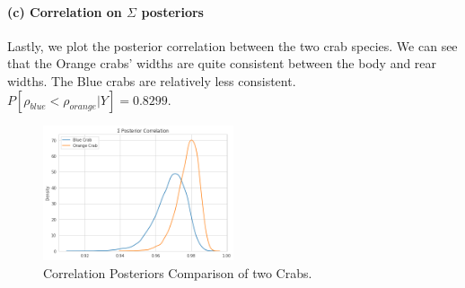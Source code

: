 \documentclass[11pt, letterpaper]{article}
\begin{document}
\paragraph{(c) Correlation on $\Sigma$ posteriors}
Lastly, we plot the posterior correlation between the two crab species. We can see that the Orange crabs' widths are quite consistent between the body and rear widths. The Blue crabs are relatively less consistent. $P[\rho_{blue} < \rho_{orange}|Y] = 0.8299$.
\begin{figure}[!h]
  \centering
  \includegraphics[width=0.5\textwidth]{3.2.png}
  \captionsetup{justification=centering}
  \caption{Correlation Posteriors Comparison of two Crabs. }
\end{figure}
\end{document}
